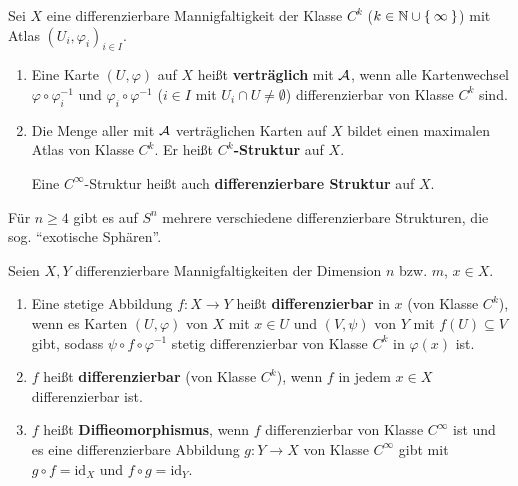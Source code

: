 \begin{definition}
    Sei $X$ eine differenzierbare Mannigfaltigkeit der Klasse $C^k$ 
    ($k \in \mathbb{N} \cup \Set{\infty}$) mit Atlas $(U_i, \varphi_i)_{i \in I}$.

    \begin{enumerate}[label=\alph*)]
        \item Eine Karte $(U, \varphi)$ auf $X$ heißt \textbf{verträglich}
              mit $\mathcal{A}$, wenn alle Kartenwechsel $\varphi \circ \varphi_i^{-1}$
              und $\varphi_i \circ \varphi^{-1}$ ($i \in I$ mit $U_i \cap U \neq \emptyset$)
              differenzierbar von Klasse $C^k$ sind.
        \item Die Menge aller mit $\mathcal{A}$ verträglichen Karten auf 
              $X$ bildet einen maximalen Atlas von Klasse $C^k$. Er
              heißt \textbf{$C^k$-Struktur} auf $X$.
            
              Eine $C^\infty$-Struktur heißt auch \textbf{differenzierbare Struktur}
              auf $X$.
    \end{enumerate}
\end{definition}

\begin{bemerkung}
    Für $n \geq 4$ gibt es auf $S^n$ mehrere verschiedene differenzierbare
    Strukturen, die sog. \enquote{exotische Sphären}.
\end{bemerkung}

\begin{definition}
    Seien $X, Y$ differenzierbare Mannigfaltigkeiten der Dimension
    $n$ bzw. $m$, $x \in X$.

    \begin{enumerate}[label=\alph*),ref=\theplaindefinition.\alph*]
        \item Eine stetige Abbildung $f:X \rightarrow Y$ heißt\label{def:stetigeAbbildungDiffbar}
              \textbf{differenzierbar}
              in $x$ (von Klasse $C^k$),
              wenn es Karten $(U, \varphi)$ von $X$ mit
              $x \in U$ und $(V, \psi)$ von $Y$ mit $f(U) \subseteq V$
              gibt, sodass $\psi \circ f \circ \varphi^{-1}$ stetig
              differenzierbar von Klasse $C^k$ in $\varphi(x)$ ist.
        \item $f$ heißt \textbf{differenzierbar}
              (von Klasse $C^k$), wenn $f$ in jedem $x \in X$ 
              differenzierbar ist.
        \item $f$ heißt \textbf{Diffieomorphismus},
              wenn $f$ differenzierbar von Klasse $C^\infty$ ist und
              es eine differenzierbare Abbildung $g: Y \rightarrow X$
              von Klasse $C^\infty$ gibt mit $g \circ f = \text{id}_X$
              und $f \circ g = \text{id}_Y$.
    \end{enumerate}
\end{definition}

